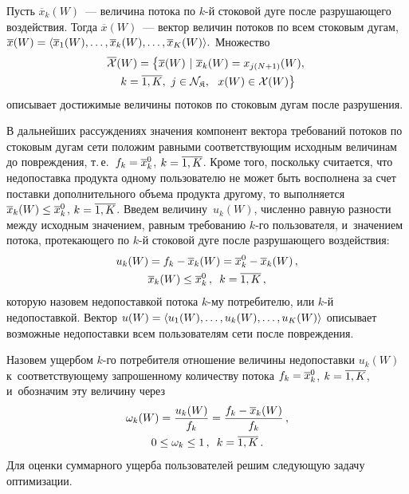 \begin{multicols}{2}
Пусть $\overline x_k(W)$~--- величина потока по $k$-й стоковой дуге после 
разрушающего воздействия. Тогда
$\overline x(W)$~--- вектор величин потоков по всем стоковым дугам,
$\overline x(W) \hm= \langle \overline x_1(W), \ldots, \overline x_k(W),
\ldots,  \overline x_K(W)\rangle.$
Множество
\begin{multline*}
\overline{\cal X}(W) = \left\{ \overline x(W) \ | \ \overline x_{k}(W) = 
x _{j (N+1)}(W),\right.\\ 
\left.k = \overline{1, K},  \ j \in 
{\cal N}_{\frak K}, \ \ x(W) \in {\cal X} (W)\right\} 
\end{multline*}
описывает достижимые величины потоков по стоковым дугам после разрушения.

В дальнейших рассуждениях значения компонент вектора требований потоков по 
стоковым дугам сети  положим равными соответствующим исходным величинам до 
повреждения, т.\,е.\ $ f_k \hm=  \overline x_k^0$, $k \hm= \overline{1, K}$.
 Кроме того, поскольку считается, что недопоставка продукта одному пользователю 
 не может быть восполнена за счет поставки дополнительного объема продукта 
 другому, то выполняется $\overline x_k(W)\hm\le \overline x_k^0$, $k \hm= 
 \overline {1, K}$.
Введем величину~$u_k(W)$, численно равную разности между исходным значением, равным
требованию $k$-го пользователя, и~значением потока, протекающего по $k$-й стоковой дуге после разрушающего воздействия:
\begin{multline*}
u_k(W) = f_k -  \overline x_k(W) = \overline x_k^0 - \overline x_k(W)\,, \\
 \overline x_k(W)\le \overline x_k^0\,,  \enskip k = \overline {1, K}\,,
\end{multline*}
которую назовем недопоставкой потока $k$-му  потребителю, или $k$-й недопоставкой.
Вектор $u(W)\hm = \langle u_1(W), \ldots, u_k(W), \ldots, u_K(W)  \rangle$
описывает возможные недопоставки всем пользователям сети \mbox{после} повреждения.

Назовем  ущербом  $k$-го потребителя отношение величины недопоставки $u_k(W)$ к~соответствующему  запрошенному количеству потока 
$f_k \hm=  \overline x_k^0$, $k \hm= \overline{1, K}$, 
и~обозначим эту величину через
\begin{multline*}
\omega_k(W) = \displaystyle\frac{\displaystyle u_k(W)\mathstrut}{\displaystyle f_k\mathstrut}= \displaystyle\frac{\displaystyle f_k - \overline x_k(W)\mathstrut}{\displaystyle f_k\mathstrut}\,, \\ 
0 \le  \omega_k \le 1\,,  \enskip k = \overline{1, K}\,.
\end{multline*}
Для оценки суммарного ущерба пользователей  решим следующую  задачу оптимизации.


\end{multicols}
